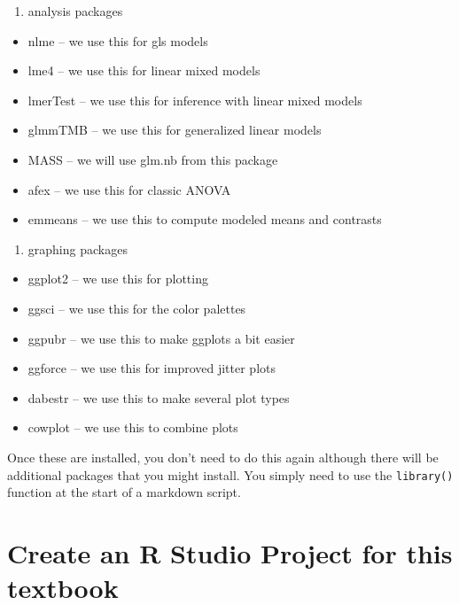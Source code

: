 \documentclass[]{book}
\providecommand{\tightlist}{%
  \setlength{\itemsep}{0pt}\setlength{\parskip}{0pt}}
\begin{document}
\begin{enumerate}
\def\labelenumi{\arabic{enumi}.}
\setcounter{enumi}{1}
\tightlist
\item
  analysis packages
\end{enumerate}

\begin{itemize}
\tightlist
\item
  nlme -- we use this for gls models
\item
  lme4 -- we use this for linear mixed models
\item
  lmerTest -- we use this for inference with linear mixed models
\item
  glmmTMB -- we use this for generalized linear models
\item
  MASS -- we will use glm.nb from this package
\item
  afex -- we use this for classic ANOVA
\item
  emmeans -- we use this to compute modeled means and contrasts
\end{itemize}

\begin{enumerate}
\def\labelenumi{\arabic{enumi}.}
\setcounter{enumi}{2}
\tightlist
\item
  graphing packages
\end{enumerate}

\begin{itemize}
\tightlist
\item
  ggplot2 -- we use this for plotting
\item
  ggsci -- we use this for the color palettes
\item
  ggpubr -- we use this to make ggplots a bit easier
\item
  ggforce -- we use this for improved jitter plots
\item
  dabestr -- we use this to make several plot types
\item
  cowplot -- we use this to combine plots
\end{itemize}

Once these are installed, you don't need to do this again although there will be additional packages that you might install. You simply need to use the \texttt{library()} function at the start of a markdown script.

\hypertarget{create-an-r-studio-project-for-this-textbook}{%
\section{Create an R Studio Project for this textbook}\label{create-an-r-studio-project-for-this-textbook}}
\end{document}

